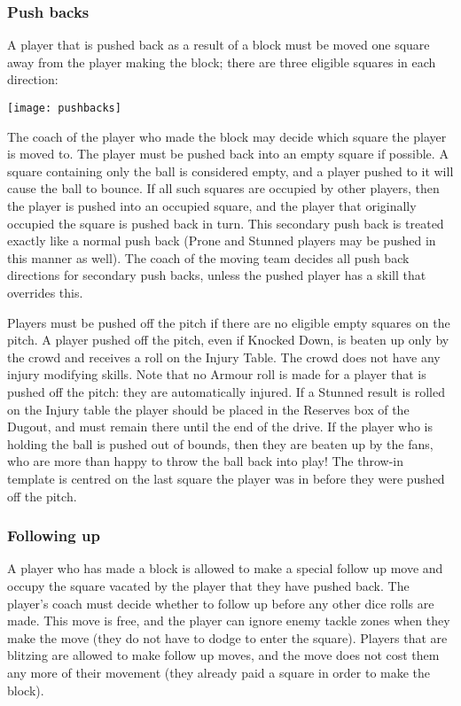 \begin{multicols}{2}
\subsubsection{Push backs}
\par A player that is pushed back as a result of a block must be moved one square away from the player making the block; there are three eligible squares in each direction:
\medskip
\begin{center}
\texttt{[image: pushbacks]}
\end{center}
\par The coach of the player who made the block may decide which square the player is moved to. The player must be pushed back into an empty square if possible. A square containing only the ball is considered empty, and a player pushed to it will cause the ball to bounce. If all such squares are occupied by other players, then the player is pushed into an occupied square, and the player that originally occupied the square is pushed back in turn. This secondary push back is treated exactly like a normal push back (Prone and Stunned players may be pushed in this manner as well). The coach of the moving team decides all push back directions for secondary push backs, unless the pushed player has a skill that overrides this.
\par Players must be pushed off the pitch if there are no eligible empty squares on the pitch. A player pushed off the pitch, even if Knocked Down, is beaten up only by the crowd and receives a roll on the Injury Table. The crowd does not have any injury modifying skills. Note that no Armour roll is made for a player that is pushed off the pitch: they are automatically injured. If a Stunned result is rolled on the Injury table the player should be placed in the Reserves box of the Dugout, and must remain there until the end of the drive. If the player who is holding the ball is pushed out of bounds, then they are beaten up by the fans, who are more than happy to throw the ball back into play! The throw-in template is centred on the last square the player was in before they were pushed off the pitch.

\subsubsection{Following up}
\par A player who has made a block is allowed to make a special follow up move and occupy the square vacated by the player that they have pushed back. The player's coach must decide whether to follow up before any other dice rolls are made. This move is free, and the player can ignore enemy tackle zones when they make the move (they do not have to dodge to enter the square). Players that are blitzing are allowed to make follow up moves, and the move does not cost them any more of their movement (they already paid a square in order to make the block).


\end{multicols}
